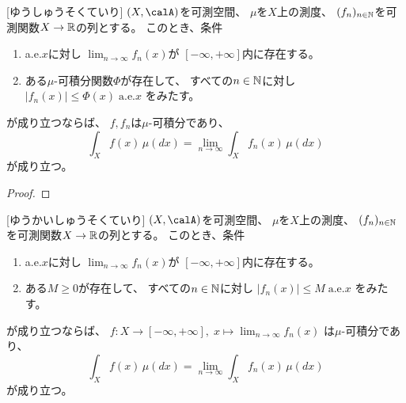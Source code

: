\documentclass[report]{jlreq}
\begin{document}
\begin{theorem}
    [ゆうしゅうそくていり]
    $(X, \calA)$を可測空間、
    $\mu$を$X$上の測度、
    $(f_n)_{n \in \mathbb{N}}$を可測関数$X \to \mathbb{R}$の列とする。
    このとき、条件
    \begin{enumerate}
        \item a.e.$x$に対し
            $\lim_{n \to \infty} f_n(x)$が
            $[-\infty, +\infty]$内に存在する。
        \item ある$\mu$-可積分関数$\Phi$が存在して、
            すべての$n \in \mathbb{N}$に対し
            $|f_n(x)| \le \Phi(x) \; \text{a.e.$x$}$
            をみたす。
    \end{enumerate}
    が成り立つならば、
    $f, f_n$は$\mu$-可積分であり、
    \begin{equation}
        \int_X f(x) \, \mu(dx)
            = \lim_{n \to \infty} \int_X f_n(x) \, \mu(dx)
    \end{equation}
    が成り立つ。
\end{theorem}

\begin{proof}
    \TODO{}
\end{proof}

\begin{corollary}
    [ゆうかいしゅうそくていり]
    $(X, \calA)$を可測空間、
    $\mu$を$X$上の測度、
    $(f_n)_{n \in \mathbb{N}}$を可測関数$X \to \mathbb{R}$の列とする。
    このとき、条件
    \begin{enumerate}
        \item a.e.$x$に対し
            $\lim_{n \to \infty} f_n(x)$が
            $[-\infty, +\infty]$内に存在する。
        \item ある$M \ge 0$が存在して、
            すべての$n \in \mathbb{N}$に対し
            $|f_n(x)| \le M \; \text{a.e.$x$}$
            をみたす。
    \end{enumerate}
    が成り立つならば、
    $f \colon X \to [-\infty, +\infty], \;
        x \mapsto \lim_{n \to \infty} f_n(x)$
    は$\mu$-可積分であり、
    \begin{equation}
        \int_X f(x) \, \mu(dx)
            = \lim_{n \to \infty} \int_X f_n(x) \, \mu(dx)
    \end{equation}
    が成り立つ。
\end{corollary}
\end{document}
